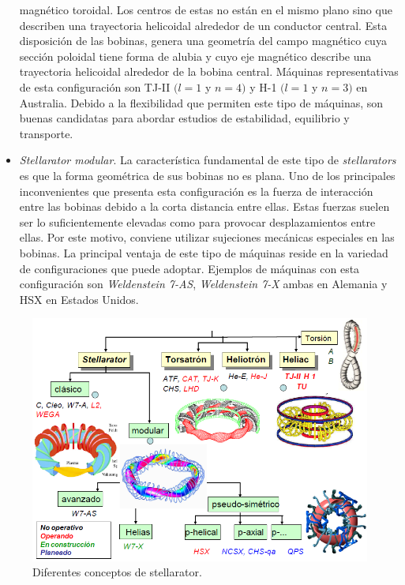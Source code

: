 \begin{itemize}
    magnético toroidal. Los centros de estas no están en el mismo plano sino que describen
    una trayectoria helicoidal alrededor de un conductor central. Esta disposición de
    las bobinas, genera una geometría del campo magnético cuya sección poloidal tiene forma
    de alubia y cuyo eje magnético describe una trayectoria helicoidal alrededor
    de la bobina central. Máquinas representativas de esta configuración son TJ-II $(l=1$ y
    $n=4)$ y H-1 $(l=1$ y $n=3)$ en Australia.
    Debido a la flexibilidad que permiten este tipo de máquinas, son buenas candidatas
    para abordar estudios de estabilidad, equilibrio y transporte.
    \item \textit{Stellarator modular}. La característica fundamental de este tipo de \textit{stellarators} es que
    la forma geométrica de sus bobinas no es plana. Uno de los principales inconvenientes
    que presenta esta configuración es la fuerza de interacción entre las bobinas debido a la
    corta distancia entre ellas. Estas fuerzas suelen ser lo suficientemente elevadas como
    para provocar desplazamientos entre ellas. Por este motivo, conviene utilizar sujeciones
    mecánicas especiales en las bobinas.
    La principal ventaja de este tipo de máquinas reside en la variedad de configuraciones
    que puede adoptar. Ejemplos de máquinas con esta configuración son \textit{Weldenstein 7-AS},
    \textit{Weldenstein 7-X} ambas en Alemania y HSX en Estados Unidos.
\end{itemize}
\begin{figure}[H]
    \centering
    \includegraphics[scale=0.6]{img/tree.png}
    \caption[Diferentes conceptos de stellarator]{Diferentes conceptos de stellarator.}
    \label{fig:tree}
\end{figure}
